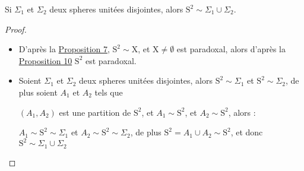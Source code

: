 \begin{lemma}\label{lemme20}
  Si $\Sigma_1$ et $\Sigma_2$ deux spheres unitées disjointes, alors $\mathrm{S}^2 \sim  \Sigma_1\cup  \Sigma_2$.
\end{lemma}
\begin{proof}
  \hfill
\begin{itemize}
  \item D'après la \hyperref[prop8]{Proposition 7}, $\mathrm{S}^2 \sim \mathrm{X}$, et $\mathrm{X}\ne \emptyset$ est paradoxal, alors d'après la \hyperref[prop11]{Proposition 10} $\mathrm{S}^2$ est paradoxal.\par
  \item Soient $\Sigma_1$ et $\Sigma_2$ deux spheres unitées disjointes, alors $\mathrm{S}^2 \sim \Sigma_1$ et $\mathrm{S}^2 \sim \Sigma_2$, de plus soient $A_1$ et $A_2$ tels que \par $(A_1, A_2)$ est une partition de $\mathrm{S}^2$, et $A_1 \sim \mathrm{S}^2$, et $A_2 \sim \mathrm{S}^2$, alors :\par
  $A_1 \sim \mathrm{S}^2 \sim \Sigma_1$ et $A_2 \sim\mathrm{S}^2 \sim \Sigma_2$, de plus $\mathrm{S}^2=A_1\cup A_2\sim \mathrm{S}^2$, et donc  $\mathrm{S}^2 \sim  \Sigma_1\cup  \Sigma_2$
\end{itemize}
\end{proof}
